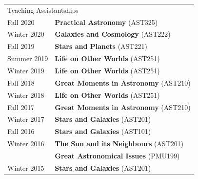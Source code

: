 \documentclass[10pt]{res} %
\begin{document}
\begin{resume}
\begin{table}[h!]
\begin{tabularx}{\textwidth}{ @{} p{6.5em} X @{} }
% 
% 
\multicolumn{2}{l}{ \rule{0pt}{3ex} \large \hspace{-12pt} Teaching Assistantships \dotfill \rule[-1.2ex]{0pt}{0pt}} \\
Fall 2020      & \textbf{Practical Astronomy} (AST325) \\
Winter 2020  & \textbf{Galaxies and Cosmology} (AST222) \\
Fall 2019      & \textbf{Stars and Planets} (AST221) \\
Summer 2019 & \textbf{Life on Other Worlds} (AST251) \\
Winter 2019 & \textbf{Life on Other Worlds} (AST251) \\
Fall 2018      & \textbf{Great Moments in Astronomy} (AST210) \\
Winter 2018 & \textbf{Life on Other Worlds} (AST251) \\
Fall 2017      & \textbf{Great Moments in Astronomy} (AST210) \\
Winter 2017 & \textbf{Stars and Galaxies} (AST201) \\
Fall 2016 & \textbf{Stars and Galaxies} (AST101) \\
Winter 2016  & \textbf{The Sun and its Neighbours} (AST201) \\
                     & \textbf{Great Astronomical Issues} (PMU199) \\
Winter 2015 & \textbf{Stars and Galaxies} (AST201)
\end{tabularx}
\end{table}



\end{resume}
\end{document}
